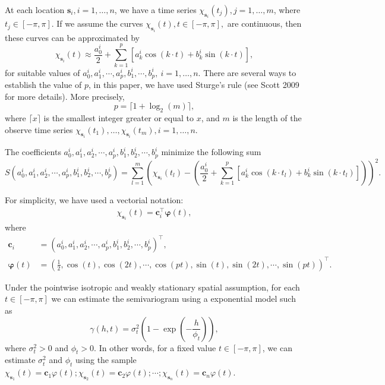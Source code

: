 \documentclass[12pt,]{article}
\theoremstyle{definition}
\theoremstyle{definition}
\theoremstyle{definition}
\theoremstyle{remark}
\begin{document}
At each location \(\bm{s}_i, i=1, \dots, n\), we have a time series \(\chi_{\bm{s}_i}(t_j), j=1, \dots, m\), where \(t_j \in [-\pi, \pi]\).
If we assume the curves \(\chi_{\bm{s}_i}(t), t\in [-\pi, \pi],\) are continuous, then these curves can be approximated by
\begin{equation*}
\chi_{\bm{s}_i}(t) \approx \dfrac{a_0^i}{2} + \sum_{k=1}^{p} \left[ a_k^i \cos(k\cdot t) + b_k^i \sin(k \cdot t) \right],
\end{equation*}
for suitable values of \(a_0^i, a_1^i, \cdots, a_p^i, b_1^i, \cdots, b_p^i, \ i=1, \dots, n\).
There are several ways to establish the value of \(p\), in this paper, we have used Sturge's rule (see Scott 2009 for more details). More precisely,
\begin{equation*}
p= \lceil 1+\log_2(m) \rceil,
\end{equation*}
where \(\lceil x \rceil\) is the smallest integer greater or equal to \(x\), and \(m\) is the length of the observe time series \(\chi_{\bm{s}_i}(t_1), \dots, \chi_{\bm{s}_i}(t_m), i=1, \dots, n\).

The coefficients \(a_0^i, a_1^i, a_2^i, \cdots, a_p^i, b_1^i, b_2^i, \cdots, b_p^i\) minimize the following sum
\begin{equation*}
S(a_0^i, a_1^i, a_2^i, \cdots, a_p^i, b_1^i, b_2^i, \cdots, b_p^i) =  \sum_{l=1}^{m}  \left( \chi_{\bm{s}_i}(t_l) - \left(
\dfrac{a_0^i}{2} + \sum_{k=1}^{p} \left[ a_k^i \cos(k\cdot t_l) + b_k^i \sin(k \cdot t_l) \right] \right) \right)^2 .
\end{equation*}

For simplicity, we have used a vectorial notation:
\begin{align*}
\chi_{\bm{s}_i}(t) =  \bm{c}_i^\top \bm{\varphi}(t),
\end{align*}
where
\begin{align*}
\bm{c}_i &= \left(a_0^i, a_1^i, a_2^i, \cdots, a_p^i, b_1^i, b_2^i, \cdots, b_p^i\right) ^\top,\\
\bm{\varphi}(t) &= \left( \frac{1}{2}, \cos(t), \cos(2t) , \cdots, \cos(pt), \sin(t), \sin(2t) , \cdots, \sin(pt)\right)^\top.
\end{align*}

Under the pointwise isotropic and weakly stationary spatial assumption, for each \(t \in [-\pi, \pi]\) we can estimate the semivariogram using a exponential model such as
\begin{equation*}
\gamma(h, t) = \sigma_t^2 \left(1-\exp\left( -\dfrac{h}{\phi_t} \right)\right),
\end{equation*}
where \(\sigma_t^2 >0\) and \(\phi_t > 0\). In other words, for a fixed value \(t \in [-\pi, \pi]\), we can estimate \(\sigma_t^2\) and \(\phi_t\) using the sample \(\chi_{\bm{s}_1}(t)=\bm{c}_1\varphi(t); \chi_{\bm{s}_2}(t)= \bm{c}_2\varphi(t);\cdots; \chi_{\bm{s}_n}(t)=\bm{c}_n\varphi(t)\).
\end{document}
